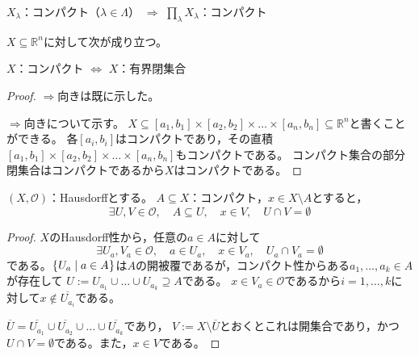 \documentclass[uplatex]{jsarticle}
\begin{document}
\begin{teiri}[Tychonoffの定理]
  $X_{\lambda}$：コンパクト（$\lambda \in \Lambda$） $\Longrightarrow$ ${\displaystyle \prod_{\lambda} X_{\lambda}}$：コンパクト
\end{teiri}

\begin{prop}
  $X \subseteq \mathbb{R}^{n}$に対して次が成り立つ。
  \begin{center}
    $X$：コンパクト $\Longleftrightarrow$ $X$：有界閉集合
  \end{center}
\end{prop}

\begin{proof}
  $\Longrightarrow$向きは既に示した。

  $\Longrightarrow$向きについて示す。
  $X \subseteq [a_{1}, b_{1}] \times [a_{2}, b_{2}] \times \dots \times [a_{n}, b_{n}] \subseteq \mathbb{R}^{n}$と書くことができる。
  各$[a_{i},b_{i}]$はコンパクトであり，その直積$[a_{1}, b_{1}] \times [a_{2}, b_{2}] \times \dots \times [a_{n}, b_{n}]$もコンパクトである。
  コンパクト集合の部分閉集合はコンパクトであるから$X$はコンパクトである。
\end{proof}

\sukima {}

\begin{prop}
  $(X, \mathcal{O})$：Hausdorffとする。
  $A \subseteq X$：コンパクト，$x \in X \setminus A$とすると，
  \begin{equation}
    \exists U, V \in \mathcal{O}, \quad A \subseteq U, \quad x \in V, \quad U \cap V = \emptyset
  \end{equation}
\end{prop}

\begin{proof}
  $X$のHausdorff性から，任意の$a \in A$に対して
  \begin{equation}
    \exists U_{a}, V_{a} \in \mathcal{O}, \quad a \in U_{a}, \quad x \in V_{a}, \quad U_{a} \cap V_{a} = \emptyset
  \end{equation}
  である。$\Set{\hspace{-1.8pt} U_{a} | a \in A \hspace{-1.8pt}}$は$A$の開被覆であるが，コンパクト性からある$a_{1}, \dots, a_{k} \in A$が存在して
  $U := U_{a_{1}} \cup \dots \cup U_{a_{k}} \supseteq A$である。
  $x \in V_{a} \in \mathcal{O}$であるから$i=1, \dots, k$に対して$x \notin \overline{U_{a_{i}}}$である。

  $\overline{U} = \overline{U_{a_{1}}} \cup \overline{U_{a_{2}}} \cup \dots \cup \overline{U_{a_{k}}}$であり，
  $V := X \setminus \overline{U}$とおくとこれは開集合であり，かつ$U \cap V = \emptyset$である。また，$x \in V$である。 
\end{proof}
\end{document}
